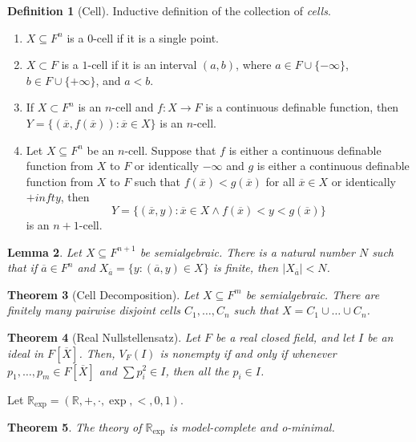\documentclass{amsart}
\newtheorem{theorem}{Theorem}[subsection]
\newtheorem{lemma}[theorem]{Lemma}
\theoremstyle{definition}
\newtheorem{definition}[theorem]{Definition}
\numberwithin{equation}{section}
\begin{document}
\begin{definition}[Cell]
    Inductive definition of the collection of \emph{cells}.
    \begin{enumerate}[label = {$\bullet$}]
        \item $X \subseteq F^n$ is a $0$-cell if it is a single point.
        \item $X \subset F$ is a $1$-cell if it is an interval $(a,b)$, where $a \in F \cup \{-\infty\}$, $b\in F\cup \{+\infty\}$, and $a < b$.
        \item If $X \subset F^n$ is an $n$-cell and $f: X\to F$ is a continuous definable function, then $Y = \{(\overline{x},f(\overline{x})): \overline{x} \in X\}$ is an $n$-cell.
        \item Let $X \subseteq F^n$ be an $n$-cell. Suppose that $f$ is either a continuous definable function from $X$ to $F$ or identically $-\infty$ and $g$ is either a continuous definable function from $X$ to $F$ such that $f(\overline{x}) < g(\overline{x})$ for all $\overline{x} \in X$ or identically $+infty$, then 
        \[
        Y = \{(\overline{x},y): \overline{x} \in X \land f(\overline{x}) < y < g(\overline{x})\}
        \]
        is an $n+1$-cell.
    \end{enumerate}
\end{definition}

\begin{lemma}
    Let $X \subseteq F^{n+1}$ be semialgebraic.
    There is a natural number $N$ such that if $\overline{a}\in F^n$
    and $X_{\overline{a}} = \{y: (\overline{a},y)\in X\}$ is finite,
    then $|X_{\overline{a}}| < N$.
\end{lemma}

\begin{theorem}[Cell Decomposition]
    Let $X \subseteq F^m$ be semialgebraic.
    There are finitely many pairwise disjoint cells $C_1,\dots,C_n$ such that $X = C_1 \cup \dots \cup C_n$.
\end{theorem}

\begin{theorem}[Real Nullstellensatz]
    Let $F$ be a real closed field,
    and let $I$ be an ideal in $F[\overline{X}]$.
    Then, $V_F(I)$ is nonempty if and only if whenever $p_1,\dots,p_m\in F[\overline{X}]$ and $\sum p_i^2 \in I$,
    then all the $p_i \in I$. 
\end{theorem}

Let $\mathbb{R}_{\exp} = (\mathbb{R},+,\cdot,\exp,<,0,1)$.

\begin{theorem}
    The theory of $\mathbb{R}_{\exp}$ is model-complete and o-minimal.
\end{theorem}
\end{document}
